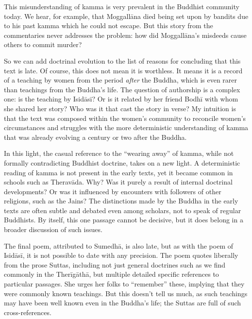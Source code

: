 \documentclass[12pt,openany]{book}%
\begin{document}
This misunderstanding of kamma is very prevalent in the Buddhist community today. We hear, for example, that \textsanskrit{Moggallāna} died being set upon by bandits due to his past kamma which he could not escape. But this story from the commentaries never addresses the problem: how did \textsanskrit{Moggallāna}’s misdeeds cause others to commit murder?

So we can add doctrinal evolution to the list of reasons for concluding that this text is late. Of course, this does not mean it is worthless. It means it is a record of a teaching by women from the period \emph{after} the Buddha, which is even rarer than teachings from the Buddha’s life. The question of authorship is a complex one: is the teaching by \textsanskrit{Isidāsī}? Or is it related by her friend \textsanskrit{Bodhī} with whom she shared her story? Who was it that cast the story in verse? My intuition is that the text was composed within the women’s community to reconcile women’s circumstances and struggles with the more deterministic understanding of kamma that was already evolving a century or two after the Buddha.

In this light, the casual reference to the “wearing away” of kamma, while not formally contradicting Buddhist doctrine, takes on a new light. A deterministic reading of kamma is not present in the early texts, yet it became common in schools such as \textsanskrit{Theravāda}. Why? Was it purely a result of internal doctrinal developments? Or was it influenced by encounters with followers of other religions, such as the Jains? The distinctions made by the Buddha in the early texts are often subtle and debated even among scholars, not to speak of regular Buddhists. By itself, this one passage cannot be decisive, but it does belong in a broader discussion of such issues.

The final poem, attributed to \textsanskrit{Sumedhā}, is also late, but as with the poem of \textsanskrit{Isidāsī}, it is not possible to date with any precision. The poem quotes liberally from the prose Suttas, including not just general doctrines such as we find commonly in the \textsanskrit{Therīgāthā}, but multiple detailed specific references to particular passages. She urges her folks to “remember” these, implying that they were commonly known teachings. But this doesn’t tell us much, as such teachings may have been well known even in the Buddha’s life; the Suttas are full of such cross-references.
\end{document}
